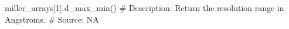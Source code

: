 miller_arrays[1].d_max_min()
# Description:  Return the resolution range in Angstroms.
# Source:  NA

